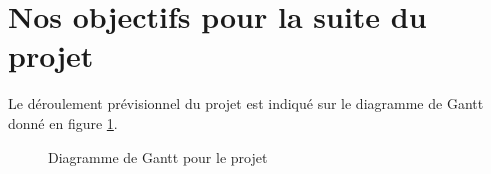 \documentclass[a4paper,11pt]{article}
\begin{document}
\section{Nos objectifs pour la suite du projet}

Le déroulement prévisionnel du projet est indiqué sur le diagramme de Gantt donné en figure \ref{gantt}.

\begin{landscape}
\begin{center}
\begin{figure}[H]
 \centering
\begin{gantt}{10}{9}
  \begin{ganttitle}
  \end{ganttitle}
  
  

\end{gantt}
\caption{Diagramme de Gantt pour le projet}
\label{gantt}
\end{figure}
\end{center}
\end{landscape}
\end{document}

